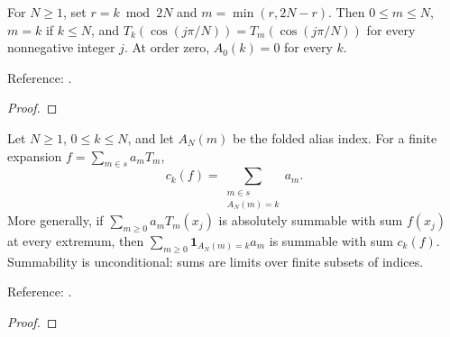 \begin{theorem}
\label{thm:extrema-aliasing}
\leanok
For $N\ge1$, set $r=k\bmod 2N$ and $m=\min(r,2N-r)$. Then $0\le m\le N$,
$m=k$ if $k\le N$, and $T_k(\cos(j\pi/N))=T_m(\cos(j\pi/N))$ for every
nonnegative integer $j$. At order zero, $A_0(k)=0$ for every $k$.

Reference: \cite[Chapter 4]{atap}.
\end{theorem}
\begin{proof}
\leanok
\end{proof}

\begin{theorem}
\label{thm:dct-coefficient-aliasing}
\leanok
Let $N\ge1$, $0\le k\le N$, and let $A_N(m)$ be the folded alias index.
For a finite expansion $f=\sum_{m\in s}a_mT_m$,
\[
 c_k(f)=\sum_{\substack{m\in s\\A_N(m)=k}}a_m.
\]
More generally, if $\sum_{m\ge0}a_mT_m(x_j)$ is absolutely summable with sum
$f(x_j)$ at every extremum, then
$\sum_{m\ge0}\mathbf1_{A_N(m)=k}a_m$ is summable with sum $c_k(f)$.
Summability is unconditional: sums are limits over finite subsets of indices.

Reference: \cite[Theorem 4.2]{atap}.
\end{theorem}
\begin{proof}
\leanok
\end{proof}

